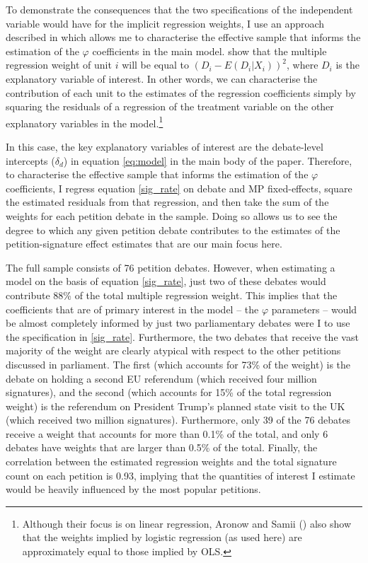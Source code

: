 \documentclass[12pt]{article}
\begin{document}
To demonstrate the consequences that the two specifications of the independent variable would have for the implicit regression weights, I use an approach described in \cite{aronow2016does} which allows me to characterise the effective sample that informs the estimation of the $\varphi$ coefficients in the main model. \cite{aronow2016does} show that the multiple regression weight of unit $i$ will be equal to $(D_i - E(D_i|X_i))^2$, where $D_i$ is the explanatory variable of interest. In other words, we can characterise the contribution of each unit to the estimates of the regression coefficients simply by squaring the residuals of a regression of the treatment variable on the other explanatory variables in the model.\footnote{Although their focus is on linear regression, Aronow and Samii (\citeyear[257]{aronow2016does}) also show that the weights implied by logistic regression (as used here) are approximately equal to those implied by OLS.} 

In this case, the key explanatory variables of interest are the debate-level intercepts ($\delta_d$) in equation \ref{eq:model} in the main body of the paper. Therefore, to characterise the effective sample that informs the estimation of the $\varphi$ coefficients, I regress equation \ref{sig_rate} on debate and MP fixed-effects, square the estimated residuals from that regression, and then take the sum of the weights for each petition debate in the sample. Doing so allows us to see the degree to which any given petition debate contributes to the estimates of the petition-signature effect estimates that are our main focus here.

The full sample consists of 76 petition debates. However, when estimating a model on the basis of equation \ref{sig_rate}, just two of these debates would contribute 88\% of the total multiple regression weight. This implies that the coefficients that are of primary interest in the model -- the $\varphi$ parameters -- would be almost completely informed by just two parliamentary debates were I to use the specification in \ref{sig_rate}. Furthermore, the two debates that receive the vast majority of the weight are clearly atypical with respect to the other petitions discussed in parliament. The first (which accounts for 73\% of the weight) is the debate on holding a second EU referendum (which received four million signatures), and the second (which accounts for 15\% of the total regression weight) is the referendum on President Trump's planned state visit to the UK (which received two million signatures). Furthermore, only 39 of the 76 debates receive a weight that accounts for more than 0.1\% of the total, and only 6 debates have weights that are larger than 0.5\% of the total. Finally, the correlation between the estimated regression weights and the total signature count on each petition is 0.93, implying that the quantities of interest I estimate would be heavily influenced by the most popular petitions.
\end{document}
